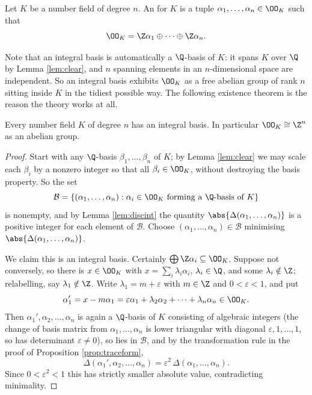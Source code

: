 \begin{definition}
	Let $K$ be a number field of degree $n$. An  for $K$ is a tuple $\alpha_1, \dots, \alpha_n \in \OO_K$ such that
	$$\OO_K = \Z\alpha_1 \oplus \dots \oplus \Z\alpha_n.$$
\end{definition}

Note that an integral basis is automatically a $\Q$-basis of $K$: it spans $K$ over $\Q$ by Lemma \ref{lem:clear}, and $n$ spanning elements in an $n$-dimensional space are independent. So an integral basis exhibits $\OO_K$ as a free abelian group of rank $n$ sitting inside $K$ in the tidiest possible way. The following existence theorem is the reason the theory works at all.

\begin{theorem}\label{thm:intbasis}
	Every number field $K$ of degree $n$ has an integral basis. In particular $\OO_K \cong \Z^n$ as an abelian group.
\end{theorem}

\begin{proof}
	Start with any $\Q$-basis $\beta_1, \dots, \beta_n$ of $K$; by Lemma \ref{lem:clear} we may scale each $\beta_i$ by a nonzero integer so that all $\beta_i \in \OO_K$, without destroying the basis property. So the set
	$$\mathcal{B} = \{(\alpha_1, \dots, \alpha_n) : \alpha_i \in \OO_K \text{ forming a } \Q\text{-basis of } K\}$$
	is nonempty, and by Lemma \ref{lem:discint} the quantity $\abs{\Delta(\alpha_1,\dots,\alpha_n)}$ is a positive integer for each element of $\mathcal B$. Choose $(\alpha_1, \dots, \alpha_n) \in \mathcal B$ minimising $\abs{\Delta(\alpha_1,\dots,\alpha_n)}$.

	We claim this is an integral basis. Certainly $\bigoplus \Z\alpha_i \subseteq \OO_K$. Suppose not conversely, so there is $x \in \OO_K$ with $x = \sum_i\lambda_i\alpha_i$, $\lambda_i \in \Q$, and some $\lambda_i \notin \Z$; relabelling, say $\lambda_1 \notin \Z$. Write $\lambda_1 = m + \varepsilon$ with $m \in \Z$ and $0 < \varepsilon < 1$, and put
	$$\alpha_1' = x - m\alpha_1 = \varepsilon\alpha_1 + \lambda_2\alpha_2 + \dots + \lambda_n\alpha_n \in \OO_K.$$
	Then $\alpha_1', \alpha_2, \dots, \alpha_n$ is again a $\Q$-basis of $K$ consisting of algebraic integers (the change of basis matrix from $\alpha_1,\dots,\alpha_n$ is lower triangular with diagonal $\varepsilon, 1, \dots, 1$, so has determinant $\varepsilon \neq 0$), so lies in $\mathcal B$, and by the transformation rule in the proof of Proposition \ref{prop:traceform},
	$$\Delta(\alpha_1',\alpha_2,\dots,\alpha_n) = \varepsilon^2\,\Delta(\alpha_1,\dots,\alpha_n).$$
	Since $0 < \varepsilon^2 < 1$ this has strictly smaller absolute value, contradicting minimality.
\end{proof}


